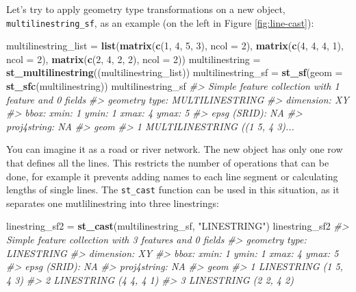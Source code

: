 \documentclass[]{krantz}
\newenvironment{Shaded}{\begin{snugshade}}{\end{snugshade}}
\newcommand{\CommentTok}[1]{\textcolor[rgb]{0.37,0.37,0.37}{\textit{#1}}}
\newcommand{\DataTypeTok}[1]{\textcolor[rgb]{0.27,0.27,0.27}{#1}}
\newcommand{\DecValTok}[1]{\textcolor[rgb]{0.06,0.06,0.06}{#1}}
\newcommand{\KeywordTok}[1]{\textcolor[rgb]{0.27,0.27,0.27}{\textbf{#1}}}
\newcommand{\NormalTok}[1]{#1}
\newcommand{\StringTok}[1]{\textcolor[rgb]{0.5,0.5,0.5}{#1}}
\begin{document}
Let's try to apply geometry type transformations on a new object, \texttt{multilinestring\_sf}, as an example (on the left in Figure \ref{fig:line-cast}):

\begin{Shaded}
\begin{Highlighting}[]
\NormalTok{multilinestring_list =}\StringTok{ }\KeywordTok{list}\NormalTok{(}\KeywordTok{matrix}\NormalTok{(}\KeywordTok{c}\NormalTok{(}\DecValTok{1}\NormalTok{, }\DecValTok{4}\NormalTok{, }\DecValTok{5}\NormalTok{, }\DecValTok{3}\NormalTok{), }\DataTypeTok{ncol =} \DecValTok{2}\NormalTok{), }
                            \KeywordTok{matrix}\NormalTok{(}\KeywordTok{c}\NormalTok{(}\DecValTok{4}\NormalTok{, }\DecValTok{4}\NormalTok{, }\DecValTok{4}\NormalTok{, }\DecValTok{1}\NormalTok{), }\DataTypeTok{ncol =} \DecValTok{2}\NormalTok{),}
                            \KeywordTok{matrix}\NormalTok{(}\KeywordTok{c}\NormalTok{(}\DecValTok{2}\NormalTok{, }\DecValTok{4}\NormalTok{, }\DecValTok{2}\NormalTok{, }\DecValTok{2}\NormalTok{), }\DataTypeTok{ncol =} \DecValTok{2}\NormalTok{))}
\NormalTok{multilinestring =}\StringTok{ }\KeywordTok{st_multilinestring}\NormalTok{((multilinestring_list))}
\NormalTok{multilinestring_sf =}\StringTok{ }\KeywordTok{st_sf}\NormalTok{(}\DataTypeTok{geom =} \KeywordTok{st_sfc}\NormalTok{(multilinestring))}
\NormalTok{multilinestring_sf}
\CommentTok{#> Simple feature collection with 1 feature and 0 fields}
\CommentTok{#> geometry type:  MULTILINESTRING}
\CommentTok{#> dimension:      XY}
\CommentTok{#> bbox:           xmin: 1 ymin: 1 xmax: 4 ymax: 5}
\CommentTok{#> epsg (SRID):    NA}
\CommentTok{#> proj4string:    NA}
\CommentTok{#>                             geom}
\CommentTok{#> 1 MULTILINESTRING ((1 5, 4 3)...}
\end{Highlighting}
\end{Shaded}

You can imagine it as a road or river network.
The new object has only one row that defines all the lines.
This restricts the number of operations that can be done, for example it prevents adding names to each line segment or calculating lengths of single lines.
The \texttt{st\_cast} function can be used in this situation, as it separates one mutlilinestring into three linestrings:

\begin{Shaded}
\begin{Highlighting}[]
\NormalTok{linestring_sf2 =}\StringTok{ }\KeywordTok{st_cast}\NormalTok{(multilinestring_sf, }\StringTok{"LINESTRING"}\NormalTok{)}
\NormalTok{linestring_sf2}
\CommentTok{#> Simple feature collection with 3 features and 0 fields}
\CommentTok{#> geometry type:  LINESTRING}
\CommentTok{#> dimension:      XY}
\CommentTok{#> bbox:           xmin: 1 ymin: 1 xmax: 4 ymax: 5}
\CommentTok{#> epsg (SRID):    NA}
\CommentTok{#> proj4string:    NA}
\CommentTok{#>                    geom}
\CommentTok{#> 1 LINESTRING (1 5, 4 3)}
\CommentTok{#> 2 LINESTRING (4 4, 4 1)}
\CommentTok{#> 3 LINESTRING (2 2, 4 2)}
\end{Highlighting}
\end{Shaded}
\end{document}
